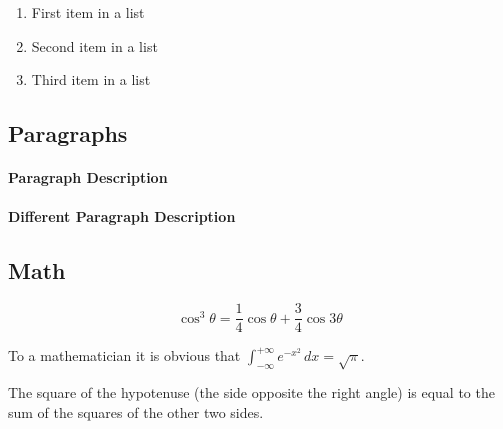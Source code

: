 \documentclass[
12pt, %
a4paper, %
oneside, %
headinclude,footinclude, %
BCOR5mm, %
]{scrartcl}
\begin{document}
\lipsum[5] %

\begin{enumerate}[noitemsep] %
\item First item in a list
\item Second item in a list
\item Third item in a list
\end{enumerate}


\subsection{Paragraphs}

\lipsum[6] %

\paragraph{Paragraph Description} \lipsum[7] %

\paragraph{Different Paragraph Description} \lipsum[8] %


\subsection{Math}

\lipsum[4] %

\begin{equation}
\cos^3 \theta =\frac{1}{4}\cos\theta+\frac{3}{4}\cos 3\theta
\label{eq:refname2}
\end{equation}

\lipsum[5] %

\begin{definition}[Gauss] 
To a mathematician it is obvious that
$\int_{-\infty}^{+\infty}
e^{-x^2}\,dx=\sqrt{\pi}$. 
\end{definition} 

\begin{theorem}[Pythagoras]
The square of the hypotenuse (the side opposite the right angle) is equal to the sum of the squares of the other two sides.
\end{theorem}
\end{document}
